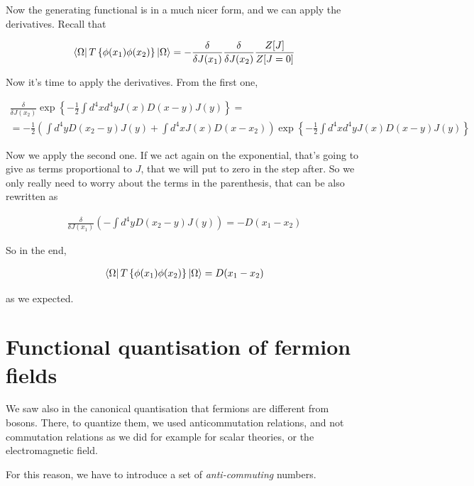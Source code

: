 \documentclass{report}
\begin{document}
{    Now the generating functional is in a much nicer form, and we can apply the derivatives. Recall that 

    \begin{align}
        \bra{\Omega}T\left\{\phi(x_1)\phi(x_2) \right\}\ket{\Omega} =  -\frac{\delta}{\delta J(x_1)}\frac{\delta}{\delta J(x_2)}\frac{Z[J]}{Z[J=0]}
    \end{align}

    Now it's time to apply the derivatives. From the first one, 

    \begin{align}
        \frac{\delta}{\delta J(x_2)}\exp\left\{-\frac{1}{2}\int d^4xd^4y J(x)D(x-y)J(y) \right\} = \\ =  -\frac{1}{2}\left(\int d^4y D(x_2-y)J(y) + \int d^4x J(x)D(x-x_2) \right)\exp\left\{-\frac{1}{2}\int d^4xd^4y J(x)D(x-y)J(y) \right\}
    \end{align}

    Now we apply the second one. If we act again on the exponential, that's going to give as terms proportional to \(J\), that we will put to zero in the step after. So we only really need to worry about the terms in the parenthesis, that can be also rewritten as 

    \begin{align}
       \frac{\delta}{\delta J(x_1)} \left(-\int d^4y D(x_2-y)J(y)\right) = -D(x_1-x_2)
    \end{align}

    So in the end, 

    \begin{align}
        \bra{\Omega}T\left\{\phi(x_1)\phi(x_2) \right\}\ket{\Omega} = D(x_1-x_2)
    \end{align}

    as we expected. 

}


\section{Functional quantisation of fermion fields}

We saw also in the canonical quantisation that fermions are different from bosons. There, to quantize them, we used anticommutation relations, and not commutation relations as we did for example for scalar theories, or the electromagnetic field. 

For this reason, we have to introduce a set of \emph{anti-commuting} numbers. 
\end{document}
